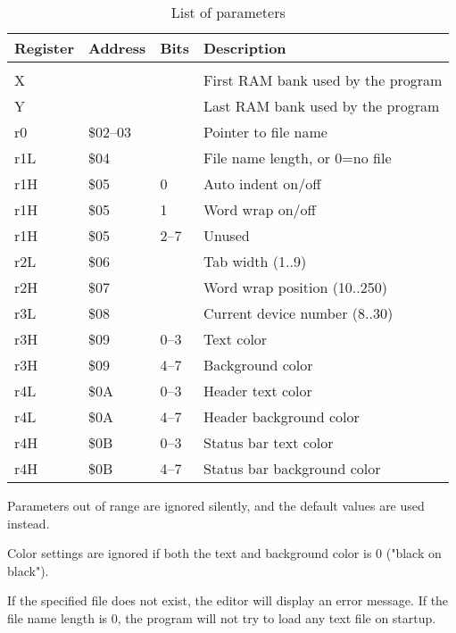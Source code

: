 \documentclass{article}
\begin{document}
        \begin{longtable}{l l l l}
            \caption{List of parameters} \\
	        \textbf{Register} & \textbf{Address} & \textbf{Bits} & \textbf{Description} \\
	        \hline \\
            X   &          &      & First RAM bank used by the program \\
            Y   &          &      & Last RAM bank used by the program \\
            r0  & \$02--03 &      & Pointer to file name \\
            r1L & \$04     &      & File name length, or 0=no file \\
            r1H & \$05     & 0    & Auto indent on/off \\
            r1H & \$05     & 1    & Word wrap on/off \\
            r1H & \$05     & 2--7 & Unused \\
            r2L & \$06     &      & Tab width (1..9) \\
            r2H & \$07     &      & Word wrap position (10..250) \\
            r3L & \$08     &      & Current device number (8..30) \\
            r3H & \$09     & 0--3 & Text color \\
            r3H & \$09     & 4--7 & Background color \\
            r4L & \$0A     & 0--3 & Header text color \\
            r4L & \$0A     & 4--7 & Header background color \\
            r4H & \$0B     & 0--3 & Status bar text color \\
            r4H & \$0B     & 4--7 & Status bar background color \\
        \end{longtable}

        \noindent Parameters out of range are ignored silently, and the default
        values are used instead.

        Color settings are ignored if both the text and background color is 0
        ("black on black").

        If the specified file does not exist, the editor will display an
        error message. If the file name length is 0, the program will not try
        to load any text file on startup.
\end{document}
